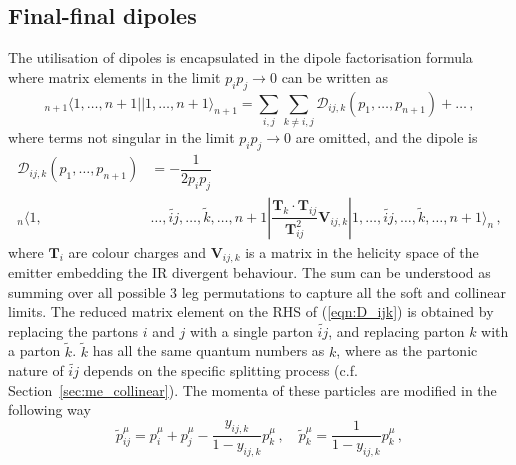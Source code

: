\documentclass[main.tex]{subfiles}
\begin{document}
    \subsection{Final-final dipoles}
        The utilisation of dipoles is encapsulated in the
        dipole factorisation formula where matrix elements in the limit
        $p_{i}p_{j} \rightarrow 0$ can be written as
        \begin{equation}\label{eqn:FF_factorisation}
            {}_{n+1} \langle 1, \ldots, n+1 | | 1, \ldots, n+1 \rangle_{n+1} = \sum_{i,j}\sum_{k\neq i,j}\mathcal{D}_{ij,k}(p_{1},\ldots,p_{n+1}) + \ldots \, ,
        \end{equation}
        where terms not singular in the limit $p_{i}p_{j} \rightarrow 0$
        are omitted, and the dipole is
        \begin{equation}\label{eqn:D_ijk}
            \begin{split}
                \mathcal{D}_{ij,k}(p_{1},\ldots,p_{n+1}) &= -\dfrac{1}{2p_{i}p_{j}} \\
                {}_{n}\langle 1, &\ldots, \widetilde{ij}, \ldots, \tilde{k}, \ldots, n+1 | \dfrac{\boldsymbol{T}_{k} \cdot \boldsymbol{T}_{ij}}{\boldsymbol{T}_{ij}^{2}} \boldsymbol{V}_{ij,k} | 1, \ldots, \widetilde{ij}, \ldots, \tilde{k}, \ldots, n+1 \rangle_{n} \, ,
            \end{split}
        \end{equation}
        where $\boldsymbol{T}_{i}$ are colour charges and $\boldsymbol{V}_{ij,k}$
        is a matrix in the helicity space of the emitter embedding the
        IR divergent behaviour.
        The sum can be understood as summing over all possible
        3 leg permutations to capture all the soft and collinear limits.
        The reduced matrix element on the RHS of (\ref{eqn:D_ijk})
        is obtained by replacing the partons $i$ and $j$ with
        a single parton $\widetilde{ij}$, and replacing parton
        $k$ with a parton $\tilde{k}$. $\tilde{k}$ has all the
        same quantum numbers as $k$, where as the
        partonic nature of $\widetilde{ij}$ depends on
        the specific splitting process (c.f. Section~\ref{sec:me_collinear}).
        The momenta of these particles are modified in the following way
        \begin{equation}\label{eqn:FF_mapping}
            \tilde{p}_{ij}^{\mu} = p_{i}^{\mu} + p_{j}^{\mu} - \dfrac{y_{ij,k}}{1-y_{ij,k}} p_{k}^{\mu} \, , \quad \tilde{p}_{k}^{\mu} = \dfrac{1}{1-y_{ij,k}}p_{k}^{\mu} \, ,
        \end{equation}
\end{document}
